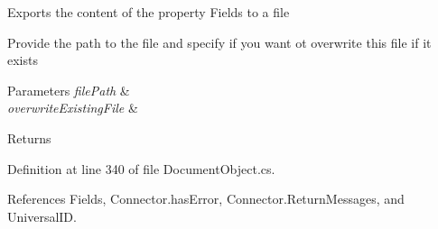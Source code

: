 Exports the content of the property \textquotesingle{}Fields\textquotesingle{} to a file 

Provide the path to the file and specify if you want ot overwrite this file if it exists


\begin{DoxyParams}{Parameters}
{\em file\+Path} & \\
\hline
{\em overwrite\+Existing\+File} & \\
\hline
\end{DoxyParams}
\begin{DoxyReturn}{Returns}

\end{DoxyReturn}


Definition at line 340 of file Document\+Object.\+cs.



References Fields, Connector.\+has\+Error, Connector.\+Return\+Messages, and Universal\+ID.


